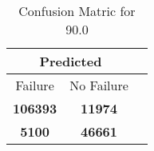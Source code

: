 \begin{table}[] 
\caption{Confusion Matric for 90.0} 
\label{Table: Prediction Accuracy-DMD90.0OnlySunEKF-combinationReflection-Reflection} 
\centering 
\begin{tabular} 
 {@{}ccc@{}} 
\toprule 
\multicolumn{2}{c}{\textbf{Predicted}}
 \\ \midrule 
\multicolumn{1}{|c|}{Failure} & 
\multicolumn{1}{c|}{No Failure}
 \\ \midrule 
\multicolumn{1}{|c|}{\color{green}\textbf{106393}} & 
\multicolumn{1}{c|}{\color{red}\textbf{11974}}
 \\ \midrule 
\multicolumn{1}{|c|}{\color{red}\textbf{5100}} & 
\multicolumn{1}{c|}{\color{green}\textbf{46661}}
 \\ \bottomrule 
\end{tabular} 
\end{table} 
